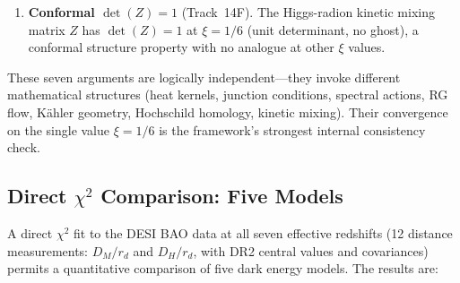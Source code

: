 \begin{remark}[Seven-fold convergence of $\xi = 1/6$]
\begin{enumerate}
\item \textbf{Conformal $\det(Z) = 1$} (Track~14F). The Higgs-radion kinetic mixing matrix $Z$ has $\det(Z) = 1$ at $\xi = 1/6$ (unit determinant, no ghost), a conformal structure property with no analogue at other $\xi$ values.
\end{enumerate}
These seven arguments are logically independent---they invoke different mathematical structures (heat kernels, junction conditions, spectral actions, RG flow, K\"ahler geometry, Hochschild homology, kinetic mixing). Their convergence on the single value $\xi = 1/6$ is the framework's strongest internal consistency check.
\end{remark}


%
%


%

\subsection{Direct $\chi^2$ Comparison: Five Models}
\label{sec:2-DESI-chi2}

A direct $\chi^2$ fit to the DESI BAO data at all seven effective redshifts (12 distance measurements: $D_M/r_d$ and $D_H/r_d$, with DR2 central values and covariances) permits a quantitative comparison of five dark energy models. The results are:

